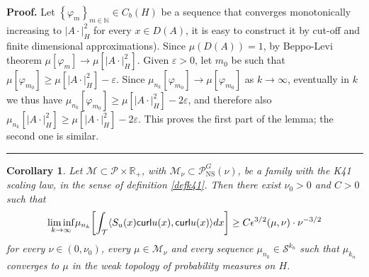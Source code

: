 \documentclass[11pt]{preprint}
\newtheorem{corollary}[theorem]{Corollary}
\newenvironment{proof}[1][Proof]{\textbf{#1.} }{\ \rule{0.5em}{0.5em}}
\begin{document}
\begin{proof}
Let $\left\{  \varphi_{m}\right\}  _{m\in\mathbb{N}}\in C_{b}\left(  H\right)
$ be a sequence that converges monotonically increasing to $\left|
A\cdot\right|  _{H}^{2}$ for every $x\in D(A)$, it is easy to construct it by
cut-off and finite dimensional approximations). Since $\mu\left(  D(A)\right)
=1$, by Beppo-Levi theorem $\mu[  \varphi_{m}]  \rightarrow
\mu [  |  A\cdot |  _{H}^{2}]  $. Given $\varepsilon>0$,
let $m_{0}$ be such that $\mu[  \varphi_{m_{0}}]  \geq\mu[
|  A\cdot |  _{H}^{2} ]  -\varepsilon$. Since $\mu_{n_{k}%
}[  \varphi_{m_{0}}]  \rightarrow \mu[
\varphi_{m_{0}}]  $ as $k \to \infty$, eventually in $k$ we thus have $\mu_{n_{k}}[
\varphi_{m_{0}}]  \geq\mu[  |  A\cdot |  _{H}^{2} ]
-2\varepsilon$, and therefore also $\mu_{n_{k}}[  |  A\cdot |
_{H}^{2}]  \geq\mu[  |  A\cdot |  _{H}^{2}]
-2\varepsilon$. This proves the first part of the lemma; the second one is similar.
\end{proof}

\begin{corollary}
\label{stretching for Galerkin}Let $\mathcal{M}\subset\mathcal{P}%
\times\mathbb{R}_{+}$, with $\mathcal{M}_{\nu}\subset\mathcal{P}%
_{{\mathrm{NS}}}^{G}\left(  \nu\right)  $, be a family with the K41 scaling
law, in the sense of definition \ref{defk41}. Then there exist $\nu_{0}>0$
and $C>0$ such that
\[
\underset{k\rightarrow\infty}{\lim\inf}\mu_{n_{k}}\left[  \int_{\mathcal{T}%
}\scal{S_{u}\left( x\right) \mathsf{curl}u\left( x\right), \mathsf{curl}%
u\left( x\right)}dx\right]  \geq C\epsilon^{3/2}\left(  \mu,\nu\right)
\cdot\nu^{-3/2}%
\]
for every $\nu\in\left(  0,\nu_{0}\right)  $, every $\mu\in\mathcal{M}_{\nu}$
and every sequence $\mu_{n_{k}}\in\mathcal{S}^{k_{n}}$ such that $\mu_{k_{n}}$
converges to $\mu$ in the weak topology of probability measures on $H$.
\end{corollary}
\end{document}
